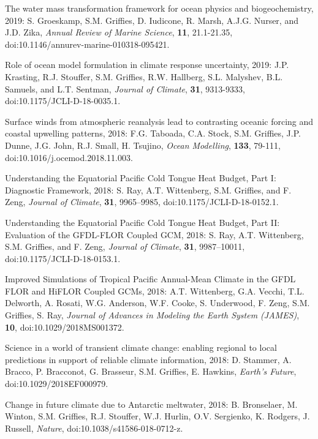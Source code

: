 \begin{etaremune}
\item The water mass transformation framework for ocean physics and biogeochemistry, 2019: S. Groeskamp, S.M. Grif\/f\/ies, D. Iudicone,  R. Marsh, A.J.G. Nurser, and J.D. Zika, {\it Annual Review of Marine Science}, {\bf 11}, 21.1-21.35, doi:10.1146/annurev-marine-010318-095421.

\item Role of ocean model formulation in climate response uncertainty, 2019: J.P. Krasting, R.J. Stouffer, S.M. Grif\/f\/ies, R.W. Hallberg, S.L. Malyshev, B.L. Samuels, and L.T. Sentman, {\it Journal of Climate}, {\bf 31}, 9313-9333, doi:10.1175/JCLI-D-18-0035.1.

\item Surface winds from atmospheric reanalysis lead to contrasting oceanic forcing and coastal upwelling patterns, 2018: F.G. Taboada, C.A. Stock, S.M. Grif\/f\/ies, J.P. Dunne, J.G. John, R.J. Small, H. Tsujino, {\it Ocean Modelling}, {\bf 133}, 79-111, 
doi:10.1016/j.ocemod.2018.11.003.

\item Understanding the Equatorial Pacific Cold Tongue Heat Budget, Part I: Diagnostic Framework, 2018: S. Ray, A.T. Wittenberg, S.M. Grif\/f\/ies, and F. Zeng, {\it Journal of Climate}, {\bf 31}, 9965--9985, doi:10.1175/JCLI-D-18-0152.1. 

\item Understanding the Equatorial Pacific Cold Tongue Heat Budget, Part II: Evaluation of the GFDL-FLOR Coupled GCM, 2018: S. Ray, A.T. Wittenberg, S.M. Grif\/f\/ies, and F. Zeng, {\it Journal of Climate}, {\bf 31}, 9987--10011, doi:10.1175/JCLI-D-18-0153.1.

\item Improved Simulations of Tropical Pacific Annual-Mean Climate in the GFDL FLOR and HiFLOR Coupled GCMs, 2018:  A.T. Wittenberg, G.A. Vecchi, T.L. Delworth, A. Rosati, W.G. Anderson, W.F. Cooke, S. Underwood, F. Zeng, S.M. Grif\/f\/ies, S. Ray, {\it Journal of Advances in Modeling the Earth System (JAMES)}, {\bf 10}, doi:10.1029/2018MS001372. 

\item Science in a world of transient climate change: enabling regional to local predictions in support of reliable climate information, 2018: D. Stammer, A. Bracco, P. Bracconot, G. Brasseur, S.M. Grif\/f\/ies, E. Hawkins, {\it Earth's Future}, \\ doi:10.1029/2018EF000979.

\item Change in future climate due to Antarctic meltwater, 2018: B. Bronselaer, M. Winton, S.M. Grif\/f\/ies, R.J. Stouffer, W.J. Hurlin, O.V. Sergienko, K. Rodgers, J. Russell, {\it  Nature}, doi:10.1038/s41586-018-0712-z.


\end{etaremune}
